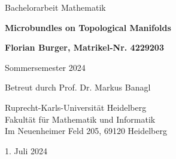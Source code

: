 \begin{titlepage}
\begin{center}
\vspace{1.5cm}

\begin{Large}Bachelorarbeit Mathematik\end{Large}

\vspace*{1cm}

\begin{LARGE}\textbf{Microbundles on Topological Manifolds}\end{LARGE}

\vspace*{1cm}

\begin{large}\textbf{Florian Burger, Matrikel-Nr. 4229203}\end{large}

\vspace{0.5cm}

\begin{large}Sommersemester 2024\end{large}

\vfill

\begin{large}
Betreut durch Prof. Dr. Markus Banagl

\vspace{0.5cm}

Ruprecht-Karls-Universität Heidelberg\\ Fakultät für Mathematik und Informatik\\ Im Neuenheimer Feld 205, 69120 Heidelberg

\vspace{0.5cm}
1. Juli 2024
\end{large}
\end{center}
\end{titlepage}